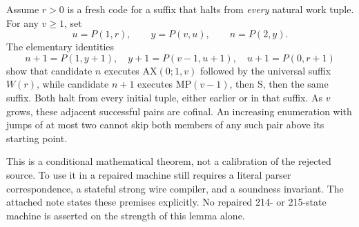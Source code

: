 Assume $r>0$ is a fresh code for a suffix that halts from \emph{every} natural work tuple. For any $v\ge1$, set
\[
u=P(1,r),\qquad y=P(v,u),\qquad n=P(2,y).
\]
The elementary identities
\[
n+1=P(1,y+1),\quad y+1=P(v-1,u+1),\quad u+1=P(0,r+1)
\]
show that candidate $n$ executes $\mathrm{AX}(0;1,v)$ followed by the universal suffix $W(r)$, while candidate $n+1$ executes $\mathrm{MP}(v-1)$, then S, then the same suffix. Both halt from every initial tuple, either earlier or in that suffix. As $v$ grows, these adjacent successful pairs are cofinal. An increasing enumeration with jumps of at most two cannot skip both members of any such pair above its starting point.

This is a conditional mathematical theorem, not a calibration of the rejected source. To use it in a repaired machine still requires a literal parser correspondence, a stateful strong wire compiler, and a soundness invariant. The attached note states these premises explicitly. No repaired 214- or 215-state machine is asserted on the strength of this lemma alone.
